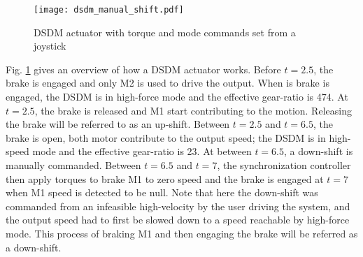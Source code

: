 %
%
\begin{figure}[hb]
	\centering
		\texttt{[image: dsdm\_manual\_shift.pdf]}
	\caption[DSDM behavior overview]{DSDM actuator with torque and mode commands set from a joystick}
	\label{fig:dsdm_manual_shift}
\end{figure}
%
Fig. \ref{fig:dsdm_manual_shift} gives an overview of how a DSDM actuator works. Before $t=2.5$, the brake is engaged and only M2 is used to drive the output. When is brake is engaged, the DSDM is in high-force mode and the effective gear-ratio is 474. At $t=2.5$, the brake is released and M1 start contributing to the motion. Releasing the brake will be referred to as an up-shift. Between $t=2.5$ and $t=6.5$, the brake is open, both motor contribute to the output speed; the DSDM is in high-speed mode and the effective gear-ratio is 23. At between $t=6.5$, a down-shift is manually commanded. Between $t=6.5$ and $t=7$, the synchronization controller then apply torques to brake M1 to zero speed and the brake is engaged at $t=7$ when M1 speed is detected to be null. Note that here the down-shift was commanded from an infeasible high-velocity by the user driving the system, and the output speed had to first be slowed down to a speed reachable by high-force mode. This process of braking M1 and then engaging the brake will be referred as a down-shift.


